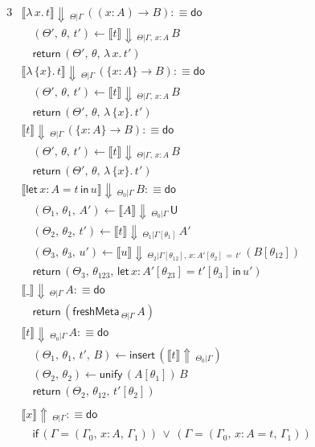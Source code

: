 \documentclass[acmsmall,review,anonymous,prologue,dvipsnames]{acmart}\settopmatter{printfolios=true,printccs=false,printacmref=false}
\newcommand{\slet}{\boldsymbol{\mathsf{let}}}
\renewcommand{\sin}{\boldsymbol{\mathsf{in}}}
\renewcommand{\U}{\mathsf{U}}
\newcommand{\freshMeta}[3]{\mathsf{freshMeta}\,_{#1|#2}\,#3}
\newcommand{\unify}{\mathsf{unify}}
\newcommand{\echeck}[4]{\llbracket#1\rrbracket\!\Downarrow\,_{#2|#3}\,#4}
\newcommand{\einfer}[3]{\llbracket#1\rrbracket\!\Uparrow\,_{#2|#3}}
\newcommand{\edo}{\boldsymbol{\mathsf{do}}}
\newcommand{\ereturn}{\boldsymbol{\mathsf{return}}}
\newcommand{\eif}{\boldsymbol{\mathsf{if}}}
\newcommand{\einsert}{\mathsf{insert}}
\theoremstyle{remark}
\begin{document}
\begin{alignat*}{3}
  &\echeck{\lambda\,x.\,t}{\Theta}{\Gamma}{((x : A)\to B)} :\equiv \edo \\
  &\quad(\Theta',\,\theta,\,t') \leftarrow \echeck{t}{\Theta}{\Gamma,\,x:A} B\\
  &\quad\ereturn\,(\Theta',\,\theta,\,\lambda\,x.\,t')\\
  &\echeck{\lambda\,\{x\}.\,t}{\Theta}{\Gamma}{(\{x : A\}\to B)} :\equiv \edo \\
  &\quad(\Theta',\,\theta,\,t') \leftarrow \echeck{t}{\Theta}{\Gamma,\,x:A} B\\
  &\quad\ereturn\,(\Theta',\,\theta,\,\lambda\,\{x\}.\,t')\\
  &\echeck{t}{\Theta}{\Gamma}{(\{x : A\}\to B)} : \equiv \edo \\
  &\quad (\Theta',\,\theta,\,t') \leftarrow \echeck{t}{\Theta}{\Gamma,\,x:A} B\\
  &\quad \ereturn\,(\Theta',\,\theta,\,\lambda\,\{x\}.\,t')\\
  &\echeck{\slet\,x:A=t\,\sin\,u}{\Theta_0}{\Gamma}{B} :\equiv \edo \\
  &\quad(\Theta_1,\,\theta_1,\,A') \leftarrow \echeck{A}{\Theta_0}{\Gamma}{\U}\\
  &\quad(\Theta_2,\,\theta_2,\,t') \leftarrow \echeck{t}
                {\Theta_1}{\Gamma[\theta_1]}{A'}\\
  &\quad(\Theta_3,\,\theta_3,\,u') \leftarrow
                \echeck{u}{\Theta_2}{\Gamma[\theta_{12}],\,x:A'[\theta_2]\,=\,t'}{(B[\theta_{12}])}\\
  &\quad\ereturn\,(\Theta_3,\,\theta_{123},\,\slet\,x:A'[\theta_{23}]=t'[\theta_3]\,\sin\,u')\\
  &\echeck{\_}{\Theta}{\Gamma}{A} :\equiv \edo \\
  &\quad\ereturn\,(\freshMeta{\Theta}{\Gamma}{A})\\
  &\echeck{t}{\Theta_0}{\Gamma}{A} :\equiv \edo \\
  &\quad(\Theta_1,\,\theta_1,\,t',\,B) \leftarrow \einsert\,(\einfer{t}{\Theta_0}{\Gamma})\\
  &\quad(\Theta_2,\,\theta_2) \leftarrow \unify\,(A[\theta_1])\,B\\
  &\quad\ereturn\,(\Theta_2,\,\theta_{12},\,t'[\theta_2])\\\\
  &\einfer{x}{\Theta}{\Gamma} :\equiv \edo\\
  &\quad\eif\,(\Gamma = (\Gamma_0,\,x : A,\,\Gamma_1))\,\lor\,(\Gamma = (\Gamma_0,\,x : A = t,\,\Gamma_1)) \\

\end{alignat*}
\end{document}
